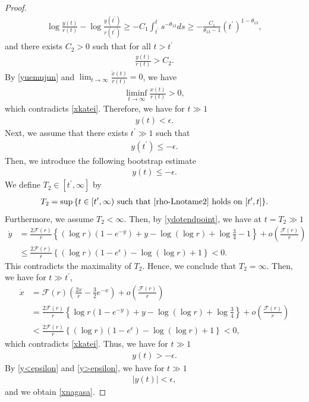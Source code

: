 \documentclass[reqno]{amsart}
\theoremstyle{plain}
\theoremstyle{definition}
\numberwithin{equation}{section}
\begin{document}
\begin{proof}
\begin{align*}
\log{\frac{y(t)}{r(t)}}-\log{\frac{y(t^{\prime})}{r(t^{\prime})}}\geq -C_1\int_{t^{\prime}}^ts^{-\theta_{13}}ds\geq -\frac{C_1}{\theta_{13}-1}\left(t^{\prime}\right)^{1-\theta_{13}},
\end{align*}
and there exists $C_2>0$ such that for all $t>t^{\prime}$
\begin{align}\label{yuemujun}
\frac{y(t)}{r(t)}>C_2.
\end{align}
By \eqref{yuemujun} and $\lim_{t\to\infty}\frac{\tilde{x}(t)}{r(t)}=0$, we have
\begin{align*}
\liminf_{t\to\infty}\frac{x(t)}{r(t)}>0,
\end{align*}
which contradicts \eqref{xkatei}. Therefore, we have for $t\gg 1$
\begin{align}\label{y<epsilon}
y(t)<\epsilon.
\end{align}
Next, we assume that there exists 
$t^{\prime}\gg1$ such that
\begin{align*}
y(t^{\prime})\leq-\epsilon.
\end{align*}
Then, we introduce the following bootstrap estimate
\begin{align}\label{rho-Lnotame2}
y(t)\leq -\epsilon.
\end{align}
We define $T_2\in [t^{\prime},\infty]$ by
\begin{align}\label{ylowerexit}
T_2=\sup{\{t\in[t^{\prime},\infty)\ \mbox{such that}\ \eqref{rho-Lnotame2}\ \mbox{holds on}\ [t^{\prime},t] \}}.
\end{align}
Furthermore, we assume $T_2<\infty$. Then, by \eqref{ydotendpoint}, we have at $t=T_2\gg 1$
\begin{align*}
\dot{y}&=\frac{2\mathcal{F}(r)}{r}\left\{\left(\log{r}\right)\left(1-e^{-y}\right)+y-\log{(\log{r})}+\log{\frac{3}{4}}-1\right\}+o\left(\frac{\mathcal{F}(r)}{r}\right)
\\
&\leq \frac{2\mathcal{F}(r)}{r}\left\{\left(\log{r}\right)\left(1-e^{\epsilon}\right)-\log{(\log{r})}+1 \right\}<0.
\end{align*}
This contradicts the maximality of $T_2$. Hence, we conclude that $T_2=\infty$. Then, we have for $t\gg t^{\prime}$,
\begin{align*}
\dot{x}&=\mathcal{F}(r)\left(\frac{2x}{r}-\frac{3}{2}e^{-x}\right)+o\left(\frac{\mathcal{F}(r)}{r}\right)
\\
&=\frac{2\mathcal{F}(r)}{r}\left\{\log{r}\left(1-e^{-y}\right)+y-\log{(\log{r})}+\log{\frac{3}{4}}\right\}+o\left(\frac{\mathcal{F}(r)}{r}\right)
\\
&<\frac{2\mathcal{F}(r)}{r}\left\{\left(\log{r}\right)\left(1-e^{\epsilon}\right)-\log{(\log{r})}+1 \right\}<0,
\end{align*}
which contradicts \eqref{xkatei}. Thus, we have for $t\gg 1$
\begin{align}\label{y>epsilon}
y(t)>-\epsilon.
\end{align}
By \eqref{y<epsilon} and \eqref{y>epsilon}, we have for $t\gg 1$
\begin{align*}
|y(t)|<\epsilon,
\end{align*}
and we obtain \eqref{xnagasa}.
\end{proof}
\end{document}
